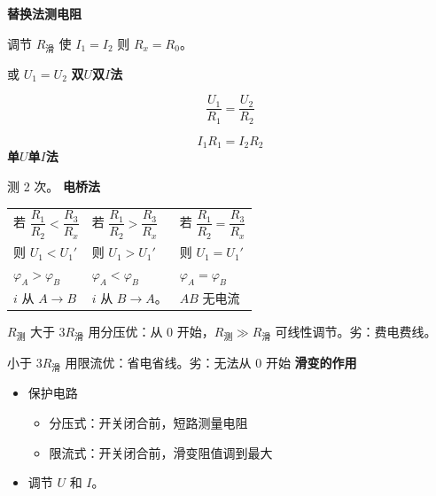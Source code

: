 \textbf{替换法测电阻}


调节 $R_{\text{滑}}$ 使 $I_1=I_2$ 则 $R_x=R_0$。

\hspace{2em}或 $U_1=U_2$
\textbf{双$U$双$I$法}


\[\frac{U_1}{R_1}=\frac{U_2}{R_2}\]


\[I_1R_1=I_2R_2\]
\textbf{单$U$单$I$法}


测 2 次。
\textbf{电桥法}


\begin{center}
\renewcommand{\arraystretch}{2.0}
\begin{tabular}{@{}lll@{}}
若 $\dfrac{R_1}{R_2}<\dfrac{R_3}{R_x}$ & 若 $\dfrac{R_1}{R_2}>\dfrac{R_3}{R_x}$ & 若 $\dfrac{R_1}{R_2}=\dfrac{R_3}{R_x}$\\
则 $U_1<U_1'$ & 则 $U_1>U_1'$ & 则 $U_1=U_1'$\\
$\varphi_A>\varphi_B$ & $\varphi_A<\varphi_B$ & $\varphi_A=\varphi_B$\\
$i$ 从 $A\to B$ & $i$ 从 $B\to A$。 & $AB$ 无电流
\end{tabular}
\end{center}
$R_{\text{测}}$ 大于 $3R_{\text{滑}}$ 用分压\quad 优：从 $0$ 开始，$R_{\text{测}}\gg R_{\text{滑}}$ 可线性调节。\quad 劣：费电费线。

小于 $3R_{\text{滑}}$ 用限流\quad 优：省电省线。\quad 劣：无法从 $0$ 开始
\textbf{滑变的作用}
\begin{itemize}
\item 保护电路
  \begin{itemize}
  \item 分压式：开关闭合前，短路测量电阻
  \item 限流式：开关闭合前，滑变阻值调到最大
  \end{itemize}
\item 调节 $U$ 和 $I$。
\end{itemize}
